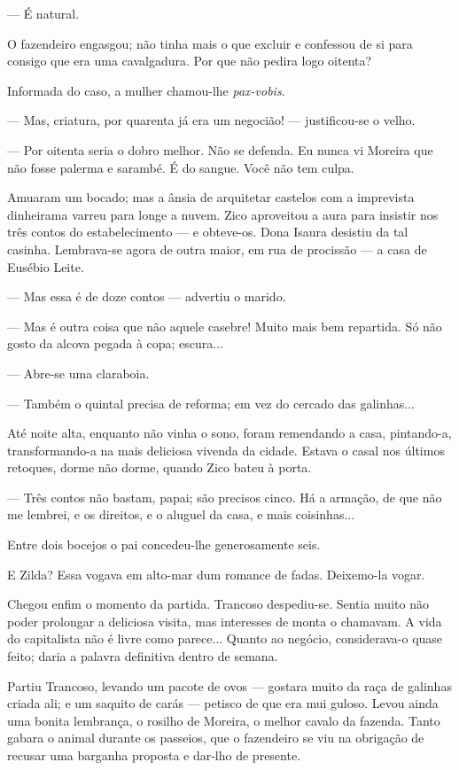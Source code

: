 --- É natural.

O fazendeiro engasgou; não tinha mais o que excluir e confessou de si
para consigo que era uma cavalgadura. Por que não pedira logo oitenta?

Informada do caso, a mulher chamou-lhe \emph{pax-vobis}.

--- Mas, criatura, por quarenta já era um negocião! --- justificou-se o
velho.

--- Por oitenta seria o dobro melhor. Não se defenda. Eu nunca vi
Moreira que não fosse palerma e sarambé. É do sangue. Você não tem
culpa.

Amuaram um bocado; mas a ânsia de arquitetar castelos com a imprevista
dinheirama varreu para longe a nuvem. Zico aproveitou a aura para
insistir nos três contos do estabelecimento --- e obteve-os. Dona Isaura
desistiu da tal casinha. Lembrava-se agora de outra maior, em rua de
procissão --- a casa de Eusébio Leite.

--- Mas essa é de doze contos --- advertiu o marido.

--- Mas é outra coisa que não aquele casebre! Muito mais bem repartida.
Só não gosto da alcova pegada à copa; escura...

--- Abre-se uma claraboia.

--- Também o quintal precisa de reforma; em vez do cercado das
galinhas...

Até noite alta, enquanto não vinha o sono, foram remendando a casa,
pintando-a, transformando-a na mais deliciosa vivenda da cidade. Estava
o casal nos últimos retoques, dorme não dorme, quando Zico bateu à
porta.

--- Três contos não bastam, papai; são precisos cinco. Há a armação, de
que não me lembrei, e os direitos, e o aluguel da casa, e mais
coisinhas...

Entre dois bocejos o pai concedeu-lhe generosamente seis.

E Zilda? Essa vogava em alto-mar dum romance de fadas. Deixemo-la vogar.

Chegou enfim o momento da partida. Trancoso despediu-se. Sentia muito
não poder prolongar a deliciosa visita, mas interesses de monta o
chamavam. A vida do capitalista não é livre como parece... Quanto ao
negócio, considerava-o quase feito; daria a palavra definitiva dentro de
semana.

Partiu Trancoso, levando um pacote de ovos --- gostara muito da raça de
galinhas criada ali; e um saquito de carás --- petisco de que era mui
guloso. Levou ainda uma bonita lembrança, o rosilho de Moreira, o melhor
cavalo da fazenda. Tanto gabara o animal durante os passeios, que o
fazendeiro se viu na obrigação de recusar uma barganha proposta e
dar-lho de presente.

